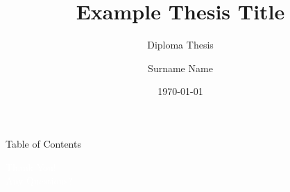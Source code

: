 \documentclass[aspectratio=169]{beamer}
\title[Diploma Thesis]{Example Thesis Title}
\subtitle{Diploma Thesis}
\author{Surname Name}
\institute[Technical University of Crete]{Electrical \& Computer Engineering School\\Technical University of Crete}
\date[\today]{\today}
\begin{document}
\begin{frame}
	\titlepage
\end{frame}

\begin{frame}{Table of Contents}
	\tableofcontents
\end{frame}










% 
% 
% 
% 
% 
% 

\begin{frame}[plain, b]
	\centering
	\huge \textcolor{white}{Thank You!}\\
	\large \textcolor{white}{Any Questions?}
	\normalsize
	\vspace*{\fill}
\end{frame}
\end{document}

